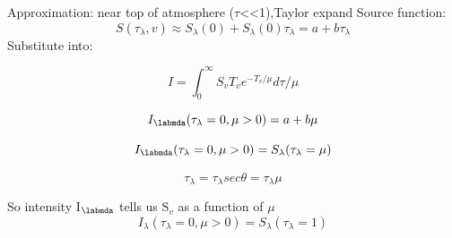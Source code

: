 Approximation: near top of atmosphere ($\tau$<<1),Taylor expand Source function:
\begin{equation}
    S(\tau_{\lambda},v) \approx S_{\lambda}(0) + S_{\lambda}(0) \tau_{\lambda} = a + b \tau_{\lambda}

\end{equation}
Substitute into:

\begin{equation}
    I = \int_{0}^{\infty} S_v T_v e^{-T_v/\mu} d\tau / \mu
\end{equation}

\begin{equation}
    I_{\labmda}(\tau_{\lambda} = 0, \mu > 0) = a + b\mu
\end{equation}

\begin{equation}
    I_{\labmda}(\tau_{\lambda} = 0, \mu > 0) = S_{\lambda}(\tau_{\lambda}= \mu)
\end{equation}

\begin{equation}
    \tau_{\lambda} = \tau_{\lambda} sec \theta = \tau_{\lambda}\mu 
\end{equation}


So intensity I$_{\labmda}$ tells us S$_v$ as a function of $\mu$
\begin{equation}
    I_{\lambda}(τ_{\lambda} = 0, \mu > 0) = S_{\lambda}(τ_{\lambda} = 1)
\end{equation}





